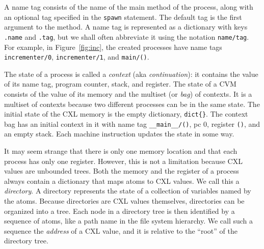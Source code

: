 \documentclass{report}
\begin{document}
A name tag consists of the name of the main method of the process,
along with an optional tag specified in the \texttt{spawn}
statement.
The default tag is the first argument to the method.
A name tag is represented as a dictionary with keys \texttt{.name}
and \texttt{.tag}, but we shall often abbreviate it using the notation
\texttt{name/tag}.
For example, in Figure~\ref{fig:inc}, the created processes have name tags
\texttt{incrementer/0}, \texttt{incrementer/1}, and \texttt{main/()}.


The state of a process is called a \emph{context} (aka \emph{continuation}):
it contains the value of
its name tag, program counter, stack, and register.
The state of a CVM
consists of the value of its memory and the multiset (or \emph{bag})
of contexts.  It is a multiset of contexts because two different processes can
be in the same state.
The initial state of the CXL memory is the empty dictionary, \texttt{dict\{\}}.
The context bag has an initial context in it with name tag
\texttt{\_\_main\_\_/()}, pc 0, register \texttt{()}, and an empty stack.
Each machine instruction updates the state in some way.


It may seem strange that there is only one memory location and that each
process has only one register.  However, this is not a limitation because
CXL values are unbounded trees.
Both the memory and the register of a process always contain
a dictionary that maps atoms to CXL values.  We call this a \emph{directory}.
A directory represents the state of a collection of variables named by the atoms.
%
Because directories are CXL values themselves,
directories can be organized into a tree.
Each node in a directory tree is then identified
by a sequence of atoms, like a path name in the file system hierarchy.  We call
such a sequence the \emph{address}
of a CXL value, and it is relative to the
``root'' of the directory tree.

\end{document}
